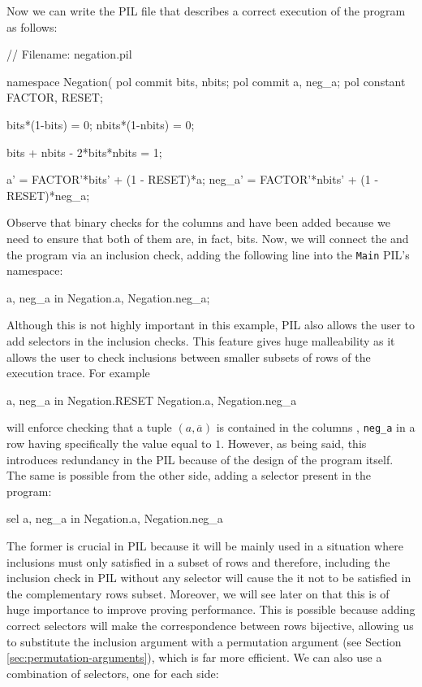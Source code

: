 Now we can write the PIL file that describes a correct execution of the \Negation program as follows:

\begin{pil}
    // Filename: negation.pil
    
    namespace Negation(%
    pol commit bits, nbits;
    pol commit a, neg_a;
    pol constant FACTOR, RESET;
    
    bits*(1-bits) = 0;
    nbits*(1-nbits) = 0;
    
    bits + nbits - 2*bits*nbits = 1;
    
    a' = FACTOR'*bits' + (1 - RESET)*a;
    neg_a' = FACTOR'*nbits' + (1 - RESET)*neg_a;
\end{pil}

Observe that binary checks for the columns \bits and \nbits have been added because we need to ensure that both of them are, in fact, bits. Now, we will connect the \Main and the \Negation program via an inclusion check, adding the following line into the \texttt{Main} PIL's namespace:

\begin{pil}
    {a, neg_a} in {Negation.a, Negation.neg_a};
\end{pil}

Although this is not highly important in this example, PIL also allows the user to add selectors in the inclusion checks. This feature gives huge malleability as it allows the user to check inclusions between smaller subsets of rows of the execution trace. For example

\begin{pil}
    {a, neg_a} in Negation.RESET {Negation.a, Negation.neg_a}
\end{pil}

will enforce checking that a tuple $(a, \overline{a})$ is contained in the columns \att, \texttt{neg\_a} in a row having specifically the \RESET value equal to $1$. However, as being said, this introduces redundancy in the PIL because of the design of the program itself. The same is possible from the other side, adding a selector \SEL present in the \Main program:

\begin{pil}
    sel {a, neg_a} in {Negation.a, Negation.neg_a}
\end{pil}

The former is crucial in PIL because it will be mainly used in a situation where inclusions must only satisfied in a subset of rows and therefore, including the inclusion check in PIL without any selector will cause the it not to be satisfied in the complementary rows subset. Moreover, we will see later on that this is of huge importance to improve proving performance. This is possible because adding correct selectors will make the correspondence between rows bijective, allowing us to substitute the inclusion argument with a permutation argument (see Section \ref{sec:permutation-arguments}), which is far more efficient.  We can also use a combination of selectors, one for each side:

